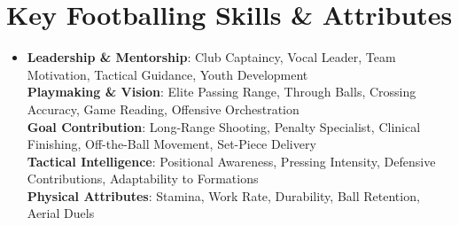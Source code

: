 \documentclass[letterpaper,11pt]{article}
\begin{document}
\section{Key Footballing Skills \& Attributes}
\begin{itemize}[leftmargin=0.15in, label={}]
\item{
\textbf{Leadership \& Mentorship}{: Club Captaincy, Vocal Leader, Team Motivation, Tactical Guidance, Youth Development} \\
\textbf{Playmaking \& Vision}{: Elite Passing Range, Through Balls, Crossing Accuracy, Game Reading, Offensive Orchestration} \\
\textbf{Goal Contribution}{: Long-Range Shooting, Penalty Specialist, Clinical Finishing, Off-the-Ball Movement, Set-Piece Delivery} \\
\textbf{Tactical Intelligence}{: Positional Awareness, Pressing Intensity, Defensive Contributions, Adaptability to Formations} \\
\textbf{Physical Attributes}{: Stamina, Work Rate, Durability, Ball Retention, Aerial Duels}
} \\
\end{itemize}



\end{document}
